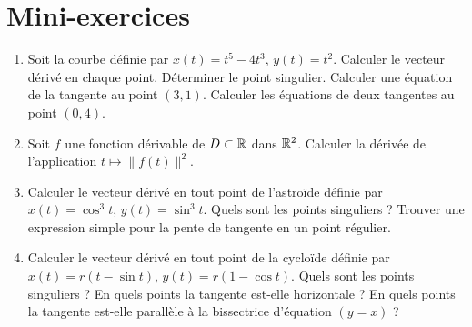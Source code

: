 \section{Mini-exercices}

\begin{frame}
\begin{miniexercice}
\begin{enumerate}
  \item Soit la courbe définie par $x(t)= t^5-4t^3$, $y(t)=t^2$. 
  Calculer le vecteur dérivé en chaque point. Déterminer le point singulier.
  Calculer une équation de la tangente au point $(3,1)$.
  Calculer les équations de deux tangentes au point $(0,4)$.
  
  \item Soit $f$ une fonction dérivable de $D \subset \mathbb{R}$ dans $\mathbb{R}^2$.
  Calculer la dérivée de l'application $t \mapsto \| f(t) \|^2$.
  
  \item Calculer le vecteur dérivé en tout point de l'astroïde définie par $x(t) = \cos^3 t$,
  $y(t) = \sin^3 t$. Quels sont les points singuliers ? Trouver une expression simple pour 
  la pente de tangente en un point régulier.
  
  \item Calculer le vecteur dérivé en tout point de la cycloïde définie par 
  $x(t) = r(t-\sin t)$,  $y(t) = r(1-\cos t)$. Quels sont les points singuliers ?
  En quels points la tangente est-elle horizontale ? En quels points la tangente est-elle
  parallèle à la bissectrice d'équation $(y=x)$ ? 
  
\end{enumerate}
\end{miniexercice}
\end{frame}


